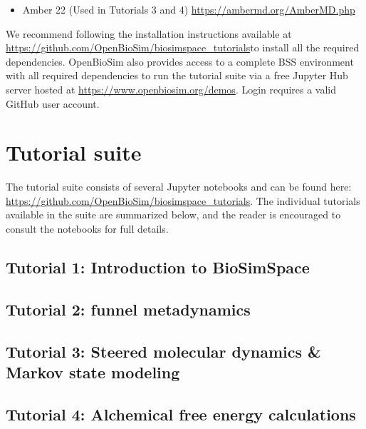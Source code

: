 \documentclass[9pt,tutorial]{livecoms}
\newcommand{\githubrepository}{\url{https://github.com/OpenBioSim/biosimspace_tutorials}}  %
\begin{document}
\begin{itemize}
    \item Amber 22 (Used in Tutorials 3 and 4) \url{https://ambermd.org/AmberMD.php}
\end{itemize}

We recommend following the installation instructions available at \githubrepository to install all the required dependencies.
OpenBioSim also provides access to a complete BSS environment with all required dependencies to run the tutorial suite via a free Jupyter Hub server hosted at \url{https://www.openbiosim.org/demos}. Login requires a valid GitHub user account. 

\section{Tutorial suite}

The tutorial suite consists of several Jupyter notebooks and can be found here: \url{https://github.com/OpenBioSim/biosimspace_tutorials}. The individual tutorials available in the suite are summarized below, and the reader is encouraged to consult the notebooks for full details.

\subsection{Tutorial 1: Introduction to BioSimSpace}


\subsection{Tutorial 2: funnel metadynamics}


\subsection{Tutorial 3: Steered molecular dynamics \& Markov state modeling}


\subsection{Tutorial 4: Alchemical free energy calculations}

\end{document}
